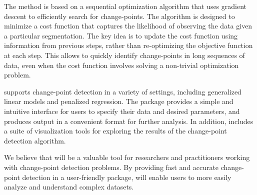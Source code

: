 \documentclass[article]{jss}
\begin{document}
The  method is based on a sequential optimization algorithm that
uses gradient descent to efficiently search for change-points. The algorithm is
designed to minimize a cost function that captures the likelihood of observing
the data given a particular segmentation. The key idea is to update the cost
function using information from previous steps, rather than re-optimizing the
objective function at each step. This allows  to quickly identify
change-points in long sequences of data, even when the cost function involves
solving a non-trivial optimization problem.

 supports change-point detection in a variety of settings,
including generalized linear models and penalized regression. The package
provides a simple and intuitive interface for users to specify their data and
desired parameters, and produces output in a convenient format for further
analysis. In addition,  includes a suite of visualization tools for
exploring the results of the change-point detection algorithm.

We believe that  will be a valuable tool for researchers and
practitioners working with change-point detection problems. By providing fast
and accurate change-point detection in a user-friendly package, 
will enable users to more easily analyze and understand complex datasets.

\end{document}
